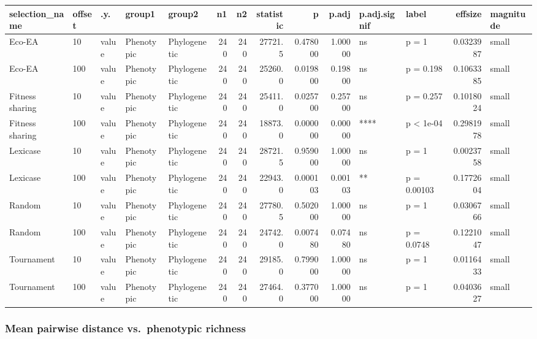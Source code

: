 \documentclass[]{book}
\begin{document}
\begin{table}
\centering
\begin{tabular}[t]{l|l|l|l|l|r|r|r|r|r|l|l|r|l}
\hline
selection\_name & offset & .y. & group1 & group2 & n1 & n2 & statistic & p & p.adj & p.adj.signif & label & effsize & magnitude\\
\hline
Eco-EA & 10 & value & Phenotypic & Phylogenetic & 240 & 240 & 27721.5 & 0.478000 & 1.00000 & ns & p = 1 & 0.0323987 & small\\
\hline
Eco-EA & 100 & value & Phenotypic & Phylogenetic & 240 & 240 & 25260.0 & 0.019800 & 0.19800 & ns & p = 0.198 & 0.1063385 & small\\
\hline
Fitness sharing & 10 & value & Phenotypic & Phylogenetic & 240 & 240 & 25411.0 & 0.025700 & 0.25700 & ns & p = 0.257 & 0.1018024 & small\\
\hline
Fitness sharing & 100 & value & Phenotypic & Phylogenetic & 240 & 240 & 18873.0 & 0.000000 & 0.00000 & **** & p < 1e-04 & 0.2981978 & small\\
\hline
Lexicase & 10 & value & Phenotypic & Phylogenetic & 240 & 240 & 28721.5 & 0.959000 & 1.00000 & ns & p = 1 & 0.0023758 & small\\
\hline
Lexicase & 100 & value & Phenotypic & Phylogenetic & 240 & 240 & 22943.0 & 0.000103 & 0.00103 & ** & p = 0.00103 & 0.1772604 & small\\
\hline
Random & 10 & value & Phenotypic & Phylogenetic & 240 & 240 & 27780.5 & 0.502000 & 1.00000 & ns & p = 1 & 0.0306766 & small\\
\hline
Random & 100 & value & Phenotypic & Phylogenetic & 240 & 240 & 24742.0 & 0.007480 & 0.07480 & ns & p = 0.0748 & 0.1221047 & small\\
\hline
Tournament & 10 & value & Phenotypic & Phylogenetic & 240 & 240 & 29185.0 & 0.799000 & 1.00000 & ns & p = 1 & 0.0116433 & small\\
\hline
Tournament & 100 & value & Phenotypic & Phylogenetic & 240 & 240 & 27464.0 & 0.377000 & 1.00000 & ns & p = 1 & 0.0403627 & small\\
\hline
\end{tabular}
\end{table}

\hypertarget{mean-pairwise-distance-vs.phenotypic-richness-1}{%
\subsubsection{Mean pairwise distance vs.~phenotypic richness}\label{mean-pairwise-distance-vs.phenotypic-richness-1}}
\end{document}
